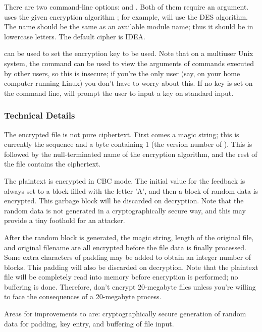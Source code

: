 \documentclass{howto}
\begin{document}
There are two command-line options:  and .  Both of
them require an argument.   uses the
given encryption algorithm ; for example,
 will use the DES algorithm.  The name should be the same
as an available module name; thus it should be in lowercase letters.
The default cipher is IDEA.

 can be used to set the encryption key to be
used.  Note that on a multiuser Unix system, the  command can
be used to view the arguments of commands executed by other users, so
this is insecure; if you're the only user (say, on your home computer
running Linux) you don't have to worry about this.  If no key is set
on the command line,  will prompt the user to input a key
on standard input.

\subsubsection{Technical Details}

The encrypted file is not pure ciphertext.  First comes a magic
string; this is currently the sequence  and a byte
containing 1 (the version number of ).
This is followed by the null-terminated name of the encryption
algorithm, and the rest of the file contains the ciphertext.  

The plaintext is encrypted in CBC mode.  The initial value for the
feedback is always set to a block filled with the letter 'A', and then
a block of random data is encrypted.  This garbage block will be
discarded on decryption.  Note that the random data is not generated
in a cryptographically secure way, and this may provide a tiny foothold for
an attacker.

After the random block is generated, the magic string, length of the
original file, and original filename are all encrypted before the file
data is finally processed.  Some extra characters of padding may be
added to obtain an integer number of blocks.  This padding will also
be discarded on decryption.  Note that the plaintext file will be
completely read into memory before encryption is performed; no
buffering is done.  Therefore, don't encrypt 20-megabyte files unless
you're willing to face the consequences of a 20-megabyte process.

Areas for improvements to  are: cryptographically secure
generation of random data
for padding, key entry, and buffering of file
input.
\end{document}
